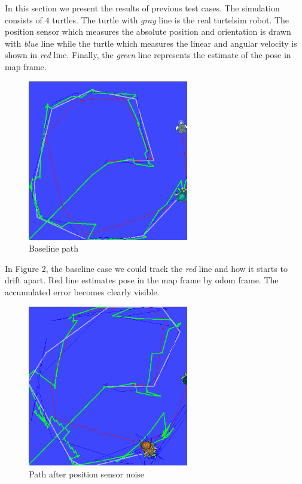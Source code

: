 \documentclass[10pt,a4paper,twocolumn]{article}
\begin{document}
In this section we present the results of previous test cases. The simulation consists of 4 turtles. The turtle with \textit{gray} line is the real turtelsim robot. The position sensor which measures the absolute position and orientation is drawn with \textit{blue} line while the turtle which measures the linear and angular velocity is shown in \textit{red} line. Finally, the \textit{green} line represents the estimate of the pose in map frame.

\begin{figure}[ht!]
	\centering
	\includegraphics[width=70mm]{baseline}
	\caption{Baseline path \label{overflow}}
\end{figure}

In Figure 2, the baseline case we could track the \textit{red} line and how it starts to drift apart. Red line estimates pose in the map frame by odom frame. The accumulated error becomes clearly visible.

\begin{figure}[ht!]
	\centering
	\includegraphics[width=70mm]{position_sensor_noise}
	\caption{Path after position sensor noise \label{overflow}}
\end{figure}
\end{document}
